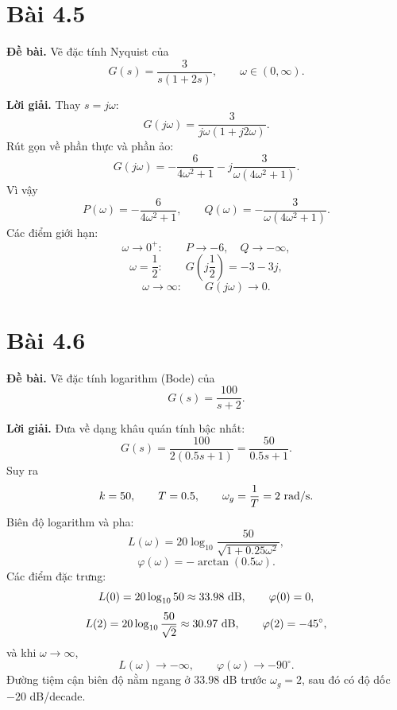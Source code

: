 \documentclass[11pt,a4paper]{article}
\newcommand{\baitap}[1]{%
  \Needspace{4\baselineskip}%
  \section*{Bài #1}%
}
\newcommand{\debai}{\par\noindent\textbf{Đề bài.}\enspace}
\newcommand{\loigiai}{\par\smallskip\noindent\textbf{Lời giải.}\enspace}
\begin{document}
\baitap{4.5}
\debai
Vẽ đặc tính Nyquist của
\[
G(s)=\frac{3}{s(1+2s)},
\qquad \omega\in(0,\infty).
\]

\loigiai
Thay \(s=j\omega\):
\[
G(j\omega)
=
\frac{3}{j\omega(1+j2\omega)}.
\]
Rút gọn về phần thực và phần ảo:
\[
\boxed{
G(j\omega)
=
-\frac{6}{4\omega^2+1}
-j\frac{3}{\omega(4\omega^2+1)}.
}
\]
Vì vậy
\[
P(\omega)=-\frac{6}{4\omega^2+1},
\qquad
Q(\omega)=-\frac{3}{\omega(4\omega^2+1)}.
\]
Các điểm giới hạn:
\[
\omega\to0^+:
\qquad
P\to-6,\quad Q\to-\infty,
\]
\[
\omega=\frac12:
\qquad
G\!\left(j\frac12\right)=-3-3j,
\]
\[
\omega\to\infty:
\qquad
G(j\omega)\to0.
\]

\begin{center}
\end{center}

\baitap{4.6}
\debai
Vẽ đặc tính logarithm (Bode) của
\[
G(s)=\frac{100}{s+2}.
\]

\loigiai
Đưa về dạng khâu quán tính bậc nhất:
\[
G(s)
=
\frac{100}{2(0.5s+1)}
=
\frac{50}{0.5s+1}.
\]
Suy ra
\[
k=50,\qquad T=0.5,
\qquad
\omega_g=\frac1T=2\ {\rm rad/s}.
\]
Biên độ logarithm và pha:
\[
\boxed{
L(\omega)
=
20\log_{10}
\frac{50}{\sqrt{1+0.25\omega^2}},
}
\]
\[
\boxed{
\varphi(\omega)=-\arctan(0.5\omega).
}
\]
Các điểm đặc trưng:
\[
L(0)=20\log_{10}50\approx33.98\ {\rm dB},
\qquad
\varphi(0)=0,
\]
\[
L(2)
=
20\log_{10}\frac{50}{\sqrt2}
\approx30.97\ {\rm dB},
\qquad
\varphi(2)=-45^\circ,
\]
và khi \(\omega\to\infty\),
\[
L(\omega)\to-\infty,
\qquad
\varphi(\omega)\to-90^\circ.
\]
Đường tiệm cận biên độ nằm ngang ở \(33.98\) dB trước \(\omega_g=2\), sau đó có độ dốc \(-20\) dB/decade.
\end{document}
